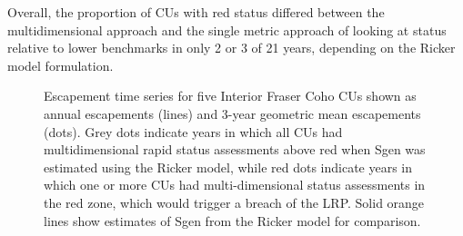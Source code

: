 \documentclass[11pt]{book}
\begin{document}
Overall, the proportion of CUs with red status differed between the multidimensional approach and the single metric approach of looking at status relative to lower benchmarks in only 2 or 3 of 21 years, depending on the Ricker model formulation.
\begin{figure}[htb]

{\centering {} 

}

\caption{Escapement time series for five Interior Fraser Coho CUs shown as annual escapements (lines) and 3-year geometric mean escapements (dots). Grey dots indicate years in which all CUs had multidimensional rapid status assessments above red when Sgen was estimated using the Ricker model, while red dots indicate years in which one or more CUs had multi-dimensional status assessments in the red zone, which would trigger a breach of the LRP. Solid orange lines show estimates of Sgen from the Ricker model for comparison.}\label{fig:coho-CU-multiDim-Ricker}
\end{figure}
\end{document}
